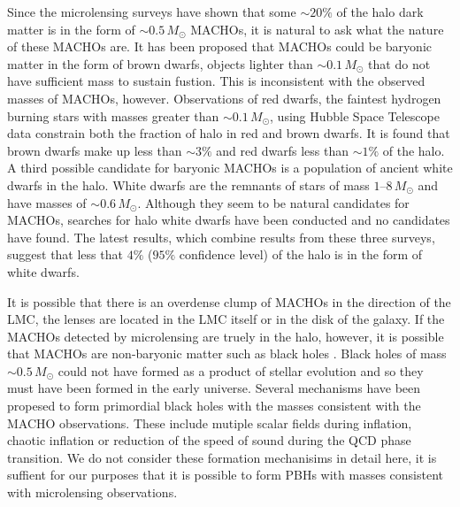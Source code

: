 Since the microlensing surveys have shown that some $\sim 20\%$ of the halo
dark matter is in the form of $\sim 0.5\,M_\odot$ MACHOs, it is natural to ask
what the nature of these MACHOs are. It has been proposed that MACHOs could be
baryonic matter in the form of brown dwarfs, objects lighter than $\sim
0.1\,M_\odot$ that do not have sufficient mass to sustain fustion. This is
inconsistent with the observed masses of MACHOs, however. Observations of red
dwarfs, the faintest hydrogen burning stars with masses greater than $\sim
0.1\,M_\odot$, using Hubble Space Telescope data constrain both the fraction
of halo in red and brown dwarfs. It is found that brown dwarfs make up less
than $\sim 3\%$ and red dwarfs less than $\sim 1\%$ of the 
halo\cite{Graff:1995ru,Graff:1996rz}.  A third possible candidate for baryonic
MACHOs is a population of ancient white dwarfs in the halo. White dwarfs are 
the remnants of stars of mass $1$--$8\,M_\odot$ and have masses of $\sim
0.6\,M_\odot$. Although they seem to be natural candidates for MACHOs, searches
for halo white dwarfs have been conducted and no candidates have
found\cite{2002A&A...389L..69G,2002ApJ...573..644N,Creze:2004gs}. The latest
results, which combine results from these three surveys, suggest that less
that $4\%$ ($95\%$ confidence level) of the halo is in the form of white
dwarfs\cite{Creze:2004gs}. 

It is possible that there is an overdense clump of MACHOs in the direction of
the LMC\cite{1996ApJ...473L..99N}, the lenses are located in the LMC
itself\cite{Salati:1999gd} or in the disk of the galaxy\cite{Evans:1997hq}. 
If the MACHOs detected by microlensing are truely in the halo, however, it is
possible that MACHOs are non-baryonic matter such as black holes
\cite{Finn:1996dd,Nakamura:1997sm}. Black holes of mass $\sim 0.5\,M_\odot$
could not have formed as a product of stellar evolution and so they must have
been formed in the early universe\cite{1967SvA....10..602Z,1974MNRAS.168..399C}.
Several mechanisms have been propesed to form primordial black holes with the
masses consistent with the MACHO observations. These include mutiple scalar
fields during inflation\cite{Yokoyama:1995ex}, chaotic 
inflation\cite{Yokoyama:1999xi} or reduction of the speed of sound during the
QCD phase transition\cite{Jedamzik:1996mr}. We do not consider these formation
mechanisims in detail here, it is suffient for our purposes that it is
possible to form PBHs with masses consistent with microlensing observations.

